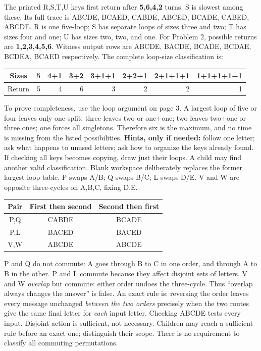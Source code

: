 \documentclass[11pt]{article}
\begin{document}
\newpage
{}
The printed R,S,T,U keys first return after \textbf{5,6,4,2} turns. S is slowest among these. Its full trace is ABCDE, BCAED, CABDE, ABCED, BCADE, CABED, ABCDE. R is one five-loop; S has separate loops of sizes three and two; T has sizes four and one; U has sizes two, two, and one.
For Problem 2, possible returns are \textbf{1,2,3,4,5,6}. Witness output rows are ABCDE, BACDE, BCADE, BCDAE, BCDEA, BCAED respectively. The complete loop-size classification is:
\begin{center}\renewcommand{\arraystretch}{1.4}\begin{tabular}{c|rrrrrrr}Sizes&5&4+1&3+2&3+1+1&2+2+1&2+1+1+1&1+1+1+1+1\\\hline Return&5&4&6&3&2&2&1\end{tabular}\end{center}
To prove completeness, use the loop argument on page 3. A largest loop of five or four leaves only one split; three leaves two or one+one; two leaves two+one or three ones; one forces all singletons. Therefore six is the maximum, and no time is missing from the listed possibilities.
\textbf{Hints, only if needed:} follow one letter; ask what happens to unused letters; ask how to organize the keys already found. If checking all keys becomes copying, draw just their loops. A child may find another valid classification. Blank workspace deliberately replaces the former largest-loop table.
P swaps A/B; Q swaps B/C; L swaps D/E. V and W are opposite three-cycles on A,B,C, fixing D,E.
\begin{center}\renewcommand{\arraystretch}{1.4}\begin{tabular}{c|c|c}Pair&First then second&Second then first\\\hline P,Q&CABDE&BCADE\\P,L&BACED&BACED\\V,W&ABCDE&ABCDE\end{tabular}\end{center}
P and Q do not commute: A goes through B to C in one order, and through A to B in the other. P and L commute because they affect disjoint sets of letters. V and W \emph{overlap} but commute: either order undoes the three-cycle. Thus ``overlap always changes the answer'' is false.
An exact rule is: reversing the order leaves every message unchanged \emph{between the two orders} precisely when the two routes give the same final letter for \emph{each} input letter. Checking ABCDE tests every input. Disjoint action is sufficient, not necessary. Children may reach a sufficient rule before an exact one; distinguish their scope. There is no requirement to classify all commuting permutations.
\end{document}
